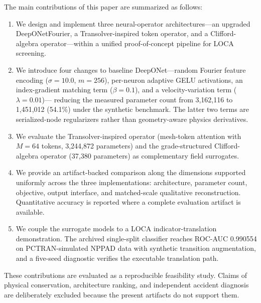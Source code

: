 \documentclass[journal]{IEEEtran}
\newcommand{\added}[1]{#1}
\begin{document}
The main contributions of this paper are summarized as follows:
\begin{enumerate}
    \item \added{We design and implement three neural-operator architectures---an upgraded DeepONetFourier, a Transolver-inspired token operator, and a Clifford-algebra operator---within a unified proof-of-concept pipeline for LOCA screening.}
    \item We introduce four changes to baseline DeepONet---random Fourier feature encoding ($\sigma = 10.0$, $m = 256$), per-neuron adaptive GELU activations, an index-gradient matching term ($\beta = 0.1$), and a velocity-variation term ($\lambda = 0.01$)--- \added{reducing the measured parameter count from 3,162,116 to 1,451,012 (54.1\%)} under the synthetic benchmark. \added{The latter two terms are serialized-node regularizers rather than geometry-aware physics derivatives.}
    \item \added{We evaluate the Transolver-inspired operator (mesh-token attention with $M = 64$ tokens, 3,244,872 parameters) and the grade-structured Clifford-algebra operator (37,380 parameters) as complementary field surrogates.}
    \item \added{We provide an artifact-backed comparison along the dimensions supported uniformly across the three implementations: architecture, parameter count, objective, output interface, and matched-scale qualitative reconstruction. Quantitative accuracy is reported where a complete evaluation artifact is available.}
    \item \added{We couple the surrogate models to a LOCA indicator-translation demonstration. The archived single-split classifier reaches ROC-AUC 0.990554 on PCTRAN-simulated NPPAD data with synthetic transition augmentation, and a five-seed diagnostic verifies the executable translation path.}
\end{enumerate}

\added{These contributions are evaluated as a reproducible feasibility study. Claims of physical conservation, architecture ranking, and independent accident diagnosis are deliberately excluded because the present artifacts do not support them.}
\end{document}
